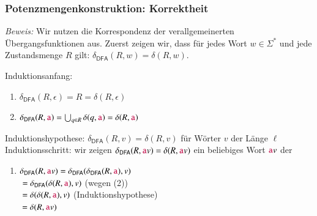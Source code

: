 \documentclass[aspectratio=1610,onlymath]{beamer}
\begin{document}
\begin{frame}[t]\frametitle{Potenzmengenkonstruktion: Korrektheit}


\emph{Beweis:} Wir nutzen die Korrespondenz der verallgemeinerten Übergangsfunktionen aus. Zuerst zeigen wir,
dass für jedes Wort $w\in\Sigma^*$ und jede Zustandsmenge $R$ gilt: $\delta_{\textsf{DFA}}(R,w) = \delta(R,w)$.\pause
\medskip

\alert{Induktionsanfang:}
\begin{enumerate}[(1)]
\item $\delta_{\textsf{DFA}}(R,\epsilon) = R = \delta(R,\epsilon)$\pause
\item $\delta_{\textsf{DFA}}(R,\mathtt{\textcolor{purple}{a}}) = \bigcup_{q\in R}\delta(q,\mathtt{\textcolor{purple}{a}}) = \delta(R,\mathtt{\textcolor{purple}{a}})$\pause
\end{enumerate}\medskip

\alert{Induktionshypothese:} $\delta_{\textsf{DFA}}(R,v) = \delta(R,v)$ für Wörter $v$ der Länge $\ell$\\[1ex]
\alert{Induktionsschritt:} wir zeigen $\delta_{\textsf{DFA}}(R,\mathtt{\textcolor{purple}{a}}v) = \delta(R,\mathtt{\textcolor{purple}{a}}v)$ ein beliebiges Wort $\mathtt{\textcolor{purple}{a}}v$ der 
\begin{enumerate}[(3)]
\item $\delta_{\textsf{DFA}}(R,\mathtt{\textcolor{purple}{a}}v) = \delta_{\textsf{DFA}}(\delta_{\textsf{DFA}}(R,\mathtt{\textcolor{purple}{a}}),v)$\\\pause
\hspace{1.58cm}${}= \delta_{\textsf{DFA}}(\delta(R,\mathtt{\textcolor{purple}{a}}),v)$ \hspace{1cm}(wegen (2))\\\pause
\hspace{1.58cm}${}= \delta(\delta(R,\mathtt{\textcolor{purple}{a}}),v)$ \hspace{1.45cm}(Induktionshypothese)\\\pause
\hspace{1.58cm}${}= \delta(R,\mathtt{\textcolor{purple}{a}}v)$
\end{enumerate}

\end{frame}
\end{document}
